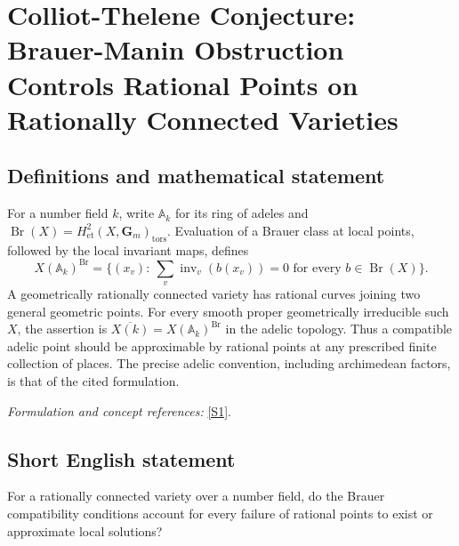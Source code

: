 \documentclass[11pt]{article}
\newcommand{\A}{\mathbb{A}}
\newcommand{\sref}[2]{\hyperlink{source:#1:#2}{[S#2]}}
\newif\ifshowcatalogue
\newcommand{\cataloguescope}[1]{\ifshowcatalogue
 \paragraph{Exact scope in the supplied catalogue.}
 \begin{quote}\small #1\end{quote}\fi}
\begin{document}
\setcounter{section}{150}
\clearpage
\section{\texorpdfstring{Colliot-Thelene Conjecture: Brauer-Manin Obstruction Controls Rational Points on Rationally Connected Varieties}{Colliot-Thelene Conjecture: Brauer-Manin Obstruction Controls Rational Points on Rationally Connected Varieties}}\label{151}
\subsection{Definitions and mathematical statement}
For a number field $k$, write $\A_k$ for its ring of adeles and $\operatorname{Br}(X)=H^2_{\mathrm{et}}(X,\mathbf G_m)_{\mathrm{tors}}$. Evaluation of a Brauer class at local points, followed by the local invariant maps, defines
\[
 X(\A_k)^{\operatorname{Br}}=\{(x_v):\ \sum_v\operatorname{inv}_v(b(x_v))=0\text{ for every }b\in\operatorname{Br}(X)\}.
\]
A geometrically rationally connected variety has rational curves joining two general geometric points. For every smooth proper geometrically irreducible such $X$, the assertion is
$\overline{X(k)}=X(\A_k)^{\operatorname{Br}}$ in the adelic topology. Thus a compatible adelic point should be approximable by rational points at any prescribed finite collection of places. The precise adelic convention, including archimedean factors, is that of the cited formulation.
\par\smallskip\textit{Formulation and concept references:} \sref{151}{1}.
\cataloguescope{Let X be a smooth, proper, geometrically irreducible variety over a number field k whose base change to an algebraic closure is rationally connected. Prove that X(k) is dense in the Brauer-Manin set X(A\_k)\textasciicircum{}\{Br(X)\}; in particular the Brauer-Manin obstruction is the only obstruction to the Hasse principle and weak approximation for such varieties.}
\subsection{Short English statement}
For a rationally connected variety over a number field, do the Brauer compatibility conditions account for every failure of rational points to exist or approximate local solutions?
\end{document}
